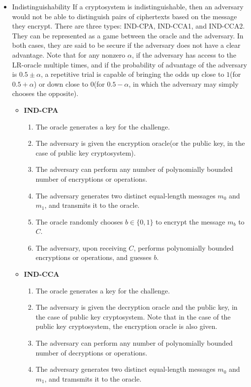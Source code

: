 \documentclass{report}
\begin{document}
\begin{itemize}
			\item Indistinguishability
			\subitem If a cryptosystem is indistinguishable, then an adversary would not be able to distinguish pairs of ciphertexts based on the message they encrypt. There are three types: IND-CPA, IND-CCA1, and IND-CCA2. They can be represented as a game between the oracle and the adversary. In both cases, they are said to be secure if the adversary does not have a clear advantage. Note that for any nonzero $\alpha$, if the adversary has access to the LR-oracle multiple times, and if the probability of advantage of the adversary is $0.5 \pm \alpha$, a repetitive trial is capable of bringing the odds up close to $1$(for $0.5+\alpha$) or down close to $0$(for $0.5-\alpha$, in which the adversary may simply chooses the opposite).
			\begin{itemize}
				\item \textbf{IND-CPA}
				\begin{enumerate}
					\item The oracle generates a key for the challenge.
					\item The adversary is given the encryption oracle(or the public key, in the case of public key cryptosystem).
					\item The adversary can perform any number of polynomially bounded number of encryptions or operations.
					\item The adversary generates two distinct equal-length messages $m_0$ and $m_1$, and transmits it to the oracle.
					\item The oracle randomly chooses $b \in \{0,1\}$ to encrypt the message $m_b$ to $C$.
					\item The adversary, upon receiving $C$, performs polynomially bounded encryptions or operations, and guesses $b$.
				\end{enumerate}
				\item \textbf{IND-CCA}
				\begin{enumerate}
					\item The oracle generates a key for the challenge.
					\item The adversary is given the decryption oracle and the public key, in the case of public key cryptosystem.
						\subitem Note that in the case of the public key cryptosystem, the encryption oracle is also given.
					\item The adversary can perform any number of polynomially bounded number of decryptions or operations.
					\item The adversary generates two distinct equal-length messages $m_0$ and $m_1$, and tramsmits it to the oracle.

\end{enumerate}
\end{itemize}
\end{itemize}
\end{document}
